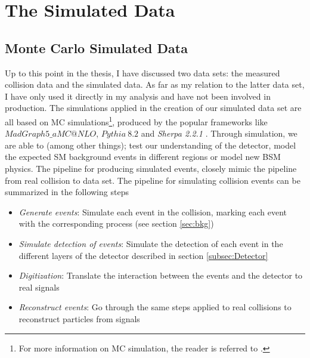 \section{The Simulated Data}
\subsection{Monte Carlo Simulated Data}
Up to this point in the thesis, I have discussed two data sets: the measured collision data and the simulated data. 
As far as my relation to the latter data set, I have only used it directly in my analysis and have not been involved in 
production. The simulations applied in the creation of our simulated data set are all based on \acf{MC} simulations\footnote{For 
more information on \ac{MC} simulation, the reader is referred to \cite{raychaudhuri_introduction_2008}.}, produced 
by the popular frameworks like \emph{$MadGraph5\_aMC@NLO$}, \emph{$Pythia\ 8.2$} and \emph{Sherpa 2.2.1} \cite{alwall_automated_2014, sjostrand_introduction_2015,Sherpa}. 
Through simulation, we are able to (among other things); test our understanding of the detector, model the expected \ac{SM} background 
events in different regions or model new \ac{BSM} physics. The pipeline for producing simulated events, closely mimic the pipeline 
from real collision to data set. The pipeline for simulating collision events can be summarized in the following steps
\begin{itemize}
  \item \emph{Generate events}: Simulate each event in the collision, marking each event with the corresponding process (see section \ref{sec:bkg})
  \item \emph{Simulate detection of events}: Simulate the detection of each event in the different layers of the detector described in section \ref{subsec:Detector}
  \item \emph{Digitization}: Translate the interaction between the events and the detector to real signals
  \item \emph{Reconstruct events}: Go through the same steps applied to real collisions to reconstruct particles from signals
\end{itemize}
